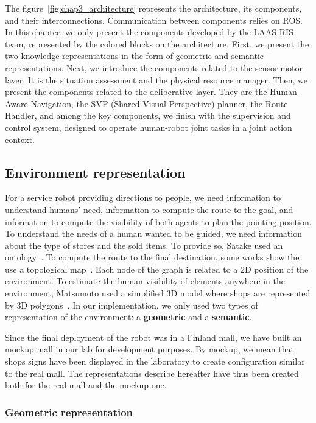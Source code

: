 \documentclass[a4paper,11pt,twoside]{StyleThese}
\begin{document}
The figure~\ref{fig:chap3_architecture} represents the architecture, its components, and their interconnections. Communication between components relies on ROS. In this chapter, we only present the components developed by the LAAS-RIS team, represented by the colored blocks on the architecture. First, we present the two knowledge representations in the form of geometric and semantic representations. Next, we introduce the components related to the sensorimotor layer. It is the situation assessment and the physical resource manager. Then, we present the components related to the deliberative layer. They are the Human-Aware Navigation, the SVP (Shared Visual Perspective) planner, the Route Handler, and among the key components, we finish with the supervision and control system, designed to operate human-robot joint tasks in a joint action context. 

\subsection{Environment representation}\label{subsec:models}

For a service robot providing directions to people, we need information to understand humans' need, information to compute the route to the goal, and information to compute the visibility of both agents to plan the pointing position. To understand the needs of a human wanted to be guided, we need information about the type of stores and the sold items. To provide so, Satake \etal{} used an ontology~\cite{satake_2015_field, satake_2015_should}. To compute the route to the final destination, some works show the use a topological map~\cite{matsumoto_2012_you,okuno_2009_providing}. Each node of the graph is related to a 2D position of the environment. To estimate the human visibility of elements anywhere in the environment,  Matsumoto \etal{} used a simplified 3D model where shops are represented by 3D polygons~\cite{matsumoto_2012_you}. In our implementation, we only used two types of representation of the environment: a \textbf{geometric} and a \textbf{semantic}.

Since the final deployment of the robot was in a Finland mall, we have built an mockup mall in our lab for development purposes. By mockup, we mean that shops signs have been displayed in the laboratory to create configuration similar to the real mall. The representations describe hereafter have thus been created both for the real mall and the mockup one.

\subsubsection{Geometric representation}
\end{document}

